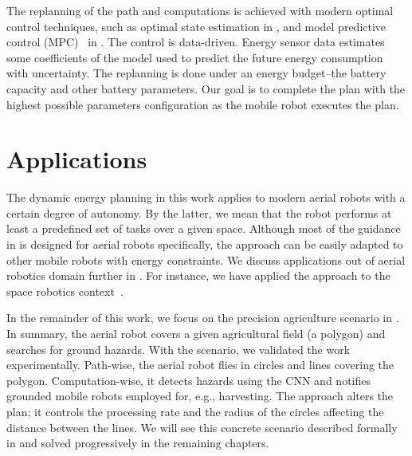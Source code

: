 The replanning of the path and computations is achieved with modern optimal control techniques, such as optimal state estimation in , and  model predictive control (MPC)~\citep{rawlings2017model} in . The control is data-driven. Energy sensor data estimates some coefficients of the model used to predict the future energy consumption with uncertainty. The replanning is done under an energy budget--the battery capacity and other battery parameters. Our goal is to complete the plan with the highest possible parameters configuration as the mobile robot executes the plan. 


\section{Applications}

The dynamic energy planning in this work applies to modern aerial robots with a certain degree of autonomy. By the latter, we mean that the robot performs at least a predefined set of tasks over a given space. Although most of the guidance in  is designed for aerial robots specifically, the approach can be easily adapted to other mobile robots with energy constraints. We discuss applications out of aerial robotics domain further in . For instance, we have applied the approach to the space robotics context~\citep{seewald2020beyond}. 

In the remainder of this work, we focus on the precision agriculture scenario in . In summary, the aerial robot covers a given agricultural field (a polygon) and searches for ground hazards. With the scenario, we validated the work experimentally. Path-wise, the aerial robot flies in circles and lines covering the polygon. Computation-wise, it detects hazards using the CNN and notifies grounded mobile robots employed for, e.g., harvesting. The approach alters the plan; it controls the processing rate and the radius of the circles affecting the distance between the lines. We will see this concrete scenario described formally in  and solved progressively in the remaining chapters.


